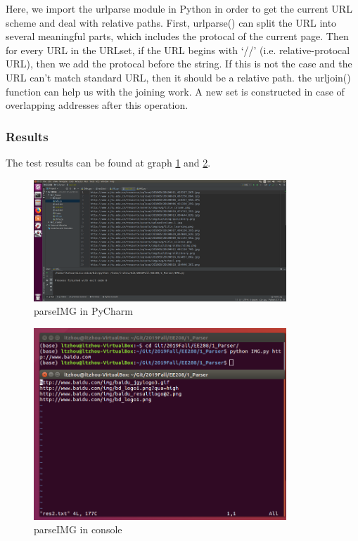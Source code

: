 \documentclass{article}
\begin{document}
Here, we import the urlparse module in Python in order to get the current URL scheme and deal with relative paths. First, urlparse() can split the URL into several meaningful parts, which includes the protocal of the current page. Then for every URL in the URLset, if the URL begins with `//' (i.e. relative-protocal URL), then we add the protocal before the string. If this is not the case and the URL can't match standard URL, then it should be a relative path. the urljoin() function can help us with the joining work. A new set is constructed in case of overlapping addresses after this operation. 

\subsubsection{Results}

The test results can be found at graph \ref{img:2.1} and \ref{img:2.2}.

\begin{figure}[htbp]
\centering
\includegraphics[width=9.5cm]{img/test2_1.png}
\caption{parseIMG in PyCharm}
\label{img:2.1}
\end{figure}

\begin{figure}[htbp]
\centering
\includegraphics[width=9.5cm]{img/test2_2.png}
\caption{parseIMG in console}
\label{img:2.2}
\end{figure}
\end{document}
